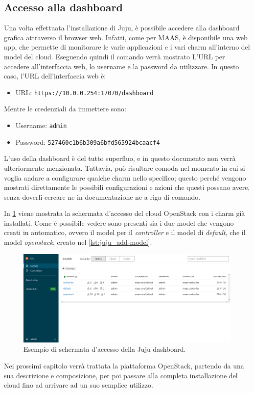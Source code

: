 \bigskip\noindent


\subsection{Accesso alla dashboard}
Una volta effettuata l'installazione di Juju, è possibile accedere alla dashboard grafica attraverso il browser web.
% 
Infatti, come per MAAS, è disponibile una web app, che permette di monitorare le varie applicazioni e i vari charm all'interno del model del cloud.
% 
Eseguendo quindi il comando  verrà mostrato L'URL per accedere all'interfaccia web, lo username e la password da utilizzare.
% 
In questo caso, l'URL dell'interfaccia web è:
% 
\begin{itemize}
    \item[]URL: \texttt{https://10.0.0.254:17070/dashboard}
\end{itemize}
% 
Mentre le credenziali da immettere sono:
% 
\begin{itemize}
    \item[]Username: \texttt{admin}

    \item[]Password: \texttt{527460c1b6b309a6bfd565924bcaacf4}
\end{itemize}

\bigskip\noindent
L'uso della dashboard è del tutto superfluo, e in questo documento non verrà ulteriormente menzionata.
% 
Tuttavia, può risultare comoda nel momento in cui si voglia andare a configurare qualche charm nello specifico;
% 
questo perché vengono mostrati direttamente le possibili configurazioni e azioni che questi possano avere, senza doverli cercare ne in documentazione ne a riga di comando.

In \cref{fig:juju_dashboard} viene mostrata la schermata d'accesso del cloud OpenStack con i charm già installati.
% 
Come è possibile vedere sono presenti sia i due model che vengono creati in automatico, ovvero il model per il \emph{controller} e il model di \emph{default}, che il model \emph{openstack}, creato nel \cref{lst:juju_add-model}.

\begin{figure}[H]
    \centering
    \includegraphics[width=1\linewidth]{tesi/files/immagini/juju/juju_dashboard.png}
    \caption{Esempio di schermata d'accesso della Juju dashboard.}
    \label{fig:juju_dashboard}
\end{figure}

\bigskip\noindent
Nei prossimi capitolo verrà trattata la piattaforma OpenStack, partendo da una sua descrizione e composizione, per poi passare alla completa installazione del cloud fino ad arrivare ad un suo semplice utilizzo.